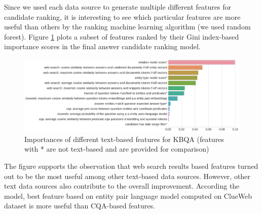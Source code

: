 
Since we used each data source to generate multiple different features for candidate ranking, it is interesting to see which particular features are  more useful than others by the ranking machine learning algorithm (we used random forest).
Figure \ref{fig:feature_importances} plots a subset of features ranked by their Gini index-based importance scores in the final answer candidate ranking model.

\begin{figure}
\centering
\includegraphics[width=\textwidth]{img/feature_importances}
\caption{Importances of different text-based features for KBQA (features with * are not text-based and are provided for comparison)}
\label{fig:feature_importances}
\end{figure}

The figure supports the observation that web search results based features turned out to be the most useful among other text-based data sources.
However, other text data sources also contribute to the overall improvement.
According the model, best feature based on entity pair language model computed on ClueWeb dataset is more useful than CQA-based features.
